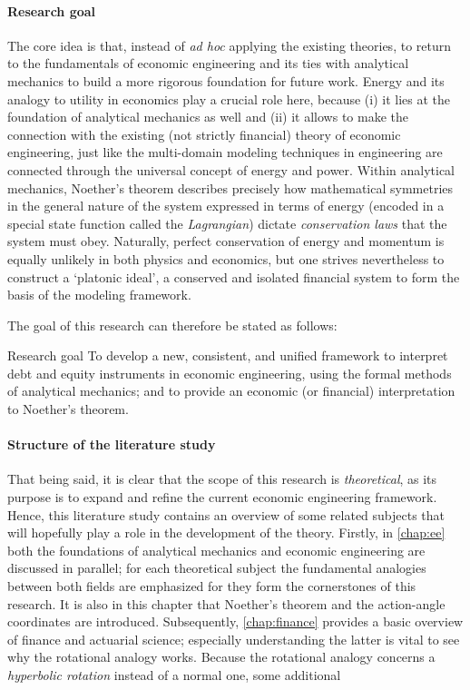 \paragraph{Research goal} The core idea is that, instead of \emph{ad hoc} applying the existing theories, to return to the fundamentals of economic engineering and its ties with analytical mechanics to build a more rigorous foundation for future work. Energy and its analogy to utility in economics play a crucial role here, because (i) it lies at the foundation of analytical mechanics as well and (ii) it allows to make the connection with the existing (not strictly financial) theory of economic engineering, just like the multi-domain modeling techniques in engineering are connected through the universal concept of energy and power. Within analytical mechanics, Noether's theorem describes precisely how mathematical symmetries in the general nature of the system expressed in terms of energy (encoded in a special state function called the \emph{Lagrangian}) dictate \emph{conservation laws} that the system must obey. Naturally, perfect conservation of energy and momentum is equally unlikely in both physics and economics, but one strives nevertheless to construct a `platonic ideal', a conserved and isolated financial system to form the basis of the modeling framework.

The goal of this research can therefore be stated as follows: 
\begin{block}{Research goal}
    To develop a new, consistent, and unified framework to interpret debt and equity instruments in economic engineering, using the formal methods of analytical mechanics; and to provide an economic (or financial) interpretation to Noether's theorem.
\end{block}
\paragraph{Structure of the literature study} That being said, it is clear that the scope of this research is \emph{theoretical}, as its purpose is to expand and refine the current economic engineering framework. Hence, this literature study contains an overview of some related subjects that will hopefully play a role in the development of the theory. Firstly, in \cref{chap:ee} both the foundations of analytical mechanics and economic engineering are discussed in parallel; for each theoretical subject the fundamental analogies between both fields are emphasized for they form the cornerstones of this research. It is also in this chapter that Noether's theorem and the action-angle coordinates are introduced. Subsequently, \cref{chap:finance} provides a basic overview of finance and actuarial science; especially understanding the latter is vital to see why the rotational analogy works. Because the rotational analogy concerns a \emph{hyperbolic rotation} instead of a normal one, some additional 



